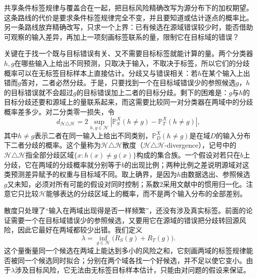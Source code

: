 共享条件标签规律与覆盖合在一起，把目标风险精确改写为源分布下的加权期望。这条路线的代价是要求条件标签规律完全不变，并且要知道或估计逐点的概率比。另一条路线放弃精确改写，只求一个上界：已有候选在源域错误较少时，能否借助可观察的输入差异，再加上一项刻画标签联系的量，限制它在目标域的错误？

关键在于找一个既与目标错误有关、又不需要目标标签就能计算的量。两个分类器$h,g$在哪些输入上给出不同预测，只取决于输入，不取决于标签，所以它们的分歧概率可以在无标签目标样本上直接估计。分歧又与错误相关：若$h$在某个输入上出错而$g$答对，二者必然分歧。于是，只要找到一个在目标域错误少的参照候选$g$，$h$的目标错误就不会超过$g$的目标错误加上二者的目标分歧。剩下的困难是：$g$与$h$的目标分歧还要和源域上的量联系起来，而这需要比较同一对分类器在两域中的分歧概率差多少。对二分类零一损失，令
\begin{equation}
 d_{\mathcal H\triangle\mathcal H}
 =2\sup_{h,g\in\mathcal H}
 \left|\mathbb P_S^X(h\neq g)-\mathbb P_T^X(h\neq g)\right|,
 \label{eq:h-delta-h-divergence}
\end{equation}
其中$h\neq g$表示二者在同一输入上给出不同类别，$\mathbb P_D^X(h\neq g)$是在域$D$的输入分布下二者分歧的概率。这个量称为$\mathcal H\triangle\mathcal H$散度（$\mathcal H\triangle\mathcal H$-divergence），记号中的$\mathcal H\triangle\mathcal H$指全部分歧区域$\{x:h(x)\neq g(x)\}$构成的集合族。一个假设对若只在$b$上分歧，它在两域的分歧概率就分别等于$b$的出现比例；两种比例之差说明源域对这类预测差异赋予的权重与目标域不同。取上确界，是因为$h$由数据选出、参照候选$g$又未知，必须对所有可能的假设对同时控制；系数2采用文献中的惯用归一化。注意它只比较$\mathcal H$能够表达的分歧区域上的概率，而不是两个输入分布的全部差别。

散度只处理了“输入在两域出现得是否一样频繁”，还没有涉及真实标签。前面的论证需要一个在目标域错误少的参照候选，又要用它在源域的错误把分歧转回源风险，因此它最好在两域都较少出错。我们定义
\[
 \lambda=\inf_{g\in\mathcal H}\bigl(R_S(g)+R_T(g)\bigr).
\]
这个量衡量同一个候选在两域上能达到多小的风险之和，它刻画两域的标签规律能否被同一个候选同时拟合；分别在两个域各找一个好候选，并不足以使它变小。由于$\lambda$涉及目标风险，它无法由无标签目标样本估计，只能由对问题的假设来保证。

